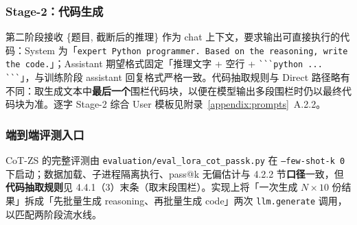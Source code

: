 \subsubsection{Stage-2：代码生成}
第二阶段接收 \{题目, 截断后的推理\} 作为 chat 上下文，要求输出可直接执行的代码：System 为「\texttt{expert Python programmer. Based on the reasoning, write the code.}」；Assistant 期望格式固定「推理文字 + 空行 + \verb|```python ... ```|」，与训练阶段 assistant 回复格式严格一致。代码抽取规则与 Direct 路径略有不同：取生成文本中\textbf{最后一个}围栏代码块，以便在模型输出多段围栏时仍以最终代码块为准。逐字 Stage-2 综合 User 模板见附录~\ref{appendix:prompts}~A.2.2。

\subsubsection{端到端评测入口}
CoT-ZS 的完整评测由 \texttt{evaluation/eval\_lora\_cot\_passk.py} 在 \texttt{--few-shot-k 0} 下启动；数据加载、子进程隔离执行、pass@k 无偏估计与 4.2.2 节\textbf{口径}一致，但\textbf{代码抽取规则}见 4.4.1（3）末条（取末段围栏）。实现上将「一次生成 $N{\times}10$ 份结果」拆成「先批量生成 reasoning、再批量生成 code」两次 \texttt{llm.generate} 调用，以匹配两阶段流水线。